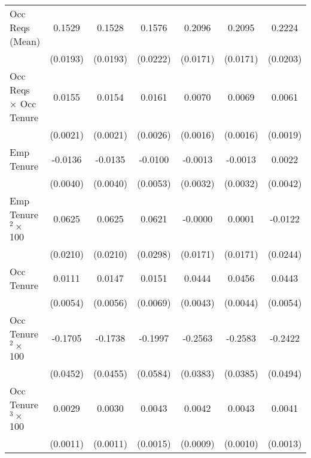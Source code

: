 {\begin{longtable}{l*{6}{c}}
Occ Reqs (Mean)     &      0.1529\sym{***}&      0.1528\sym{***}&      0.1576\sym{***}&      0.2096\sym{***}&      0.2095\sym{***}&      0.2224\sym{***}\\
                    &    (0.0193)         &    (0.0193)         &    (0.0222)         &    (0.0171)         &    (0.0171)         &    (0.0203)         \\
Occ Reqs $\times$ Occ Tenure&      0.0155\sym{***}&      0.0154\sym{***}&      0.0161\sym{***}&      0.0070\sym{***}&      0.0069\sym{***}&      0.0061\sym{***}\\
                    &    (0.0021)         &    (0.0021)         &    (0.0026)         &    (0.0016)         &    (0.0016)         &    (0.0019)         \\
Emp Tenure          &     -0.0136\sym{***}&     -0.0135\sym{***}&     -0.0100\sym{*}  &     -0.0013         &     -0.0013         &      0.0022         \\
                    &    (0.0040)         &    (0.0040)         &    (0.0053)         &    (0.0032)         &    (0.0032)         &    (0.0042)         \\
Emp Tenure$^2\times$ 100&      0.0625\sym{***}&      0.0625\sym{***}&      0.0621\sym{**} &     -0.0000         &      0.0001         &     -0.0122         \\
                    &    (0.0210)         &    (0.0210)         &    (0.0298)         &    (0.0171)         &    (0.0171)         &    (0.0244)         \\
Occ Tenure          &      0.0111\sym{**} &      0.0147\sym{***}&      0.0151\sym{**} &      0.0444\sym{***}&      0.0456\sym{***}&      0.0443\sym{***}\\
                    &    (0.0054)         &    (0.0056)         &    (0.0069)         &    (0.0043)         &    (0.0044)         &    (0.0054)         \\
Occ Tenure$^2\times$ 100&     -0.1705\sym{***}&     -0.1738\sym{***}&     -0.1997\sym{***}&     -0.2563\sym{***}&     -0.2583\sym{***}&     -0.2422\sym{***}\\
                    &    (0.0452)         &    (0.0455)         &    (0.0584)         &    (0.0383)         &    (0.0385)         &    (0.0494)         \\
Occ Tenure$^3\times$ 100&      0.0029\sym{***}&      0.0030\sym{***}&      0.0043\sym{***}&      0.0042\sym{***}&      0.0043\sym{***}&      0.0041\sym{***}\\
                    &    (0.0011)         &    (0.0011)         &    (0.0015)         &    (0.0009)         &    (0.0010)         &    (0.0013)         \\

\end{longtable}}

